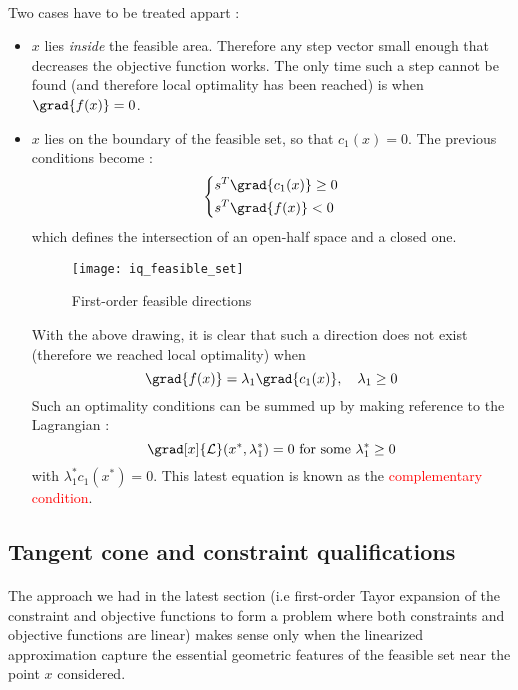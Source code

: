 \documentclass[a4paper]{article}
\begin{document}
{{			\paragraph{} Two cases have to be treated appart : 
			\begin{itemize}
				\item $x$ lies \emph{inside} the feasible area. Therefore any step vector small enough that decreases the objective function works. The only time such a step cannot be found (and therefore local optimality has been reached) is when $\grad{f(x)}=0$. 
				\item $x$ lies on the boundary of the feasible set, so that $c_1(x) = 0$. The previous conditions become :
				\begin{equation}
					\left\{ \begin{aligned}
						&s^T\grad{c_1(x)} \geq 0 \\
						& s^T\grad{f(x)} < 0 
					\end{aligned}\right. 
				\end{equation}
			which defines the intersection of an open-half space and a closed one.
				 \vspace{10pt} 
				\begin{figure}[h!]
					\begin{center}
						\texttt{[image: iq\_feasible\_set]}
						\caption{First-order feasible directions}
					\end{center}
				\end{figure}
				With the above drawing, it is clear that such a direction does not exist (therefore we reached local optimality) when 
				\begin{equation}
					\grad{f(x)} = \lambda_1 \grad{c_1(x)}, \quad \lambda_1 \geq 0 
				\end{equation}
				Such an optimality conditions can be summed up by making reference to the Lagrangian : 
				\begin{equation}
					\grad[x]{\mathcal{L}}(x^*,\lambda_1^*)  = 0 \text{ for some } \lambda_1^*\geq 0
					\end{equation}
					with $\lambda_1^*c_1(x^*) = 0$. This latest equation is known as the \textcolor{red}{complementary condition}. 
			\end{itemize}
		}
		\subsection{Tangent cone and constraint qualifications}
		{
			\paragraph{} The approach we had in the latest section (i.e first-order Tayor expansion of the constraint and objective functions to form a problem where both constraints and objective functions are linear) makes sense only when the linearized approximation capture the essential geometric features of the feasible set near the point $x$ considered. 
			
}}
\end{document}
